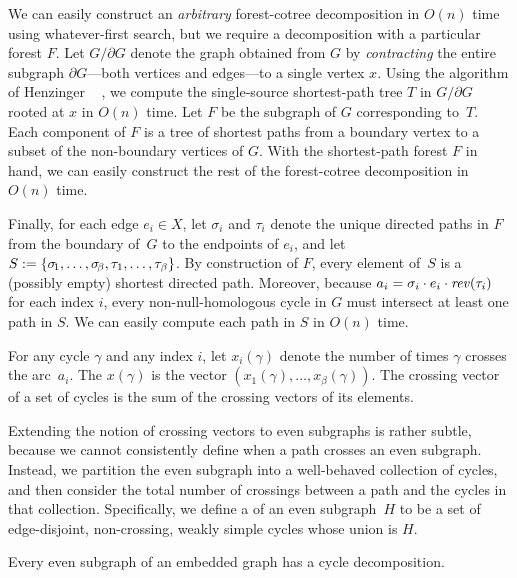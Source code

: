 We can easily construct an \emph{arbitrary} forest-cotree decomposition in $O(n)$ time using whatever-first search, but we require a decomposition with a particular forest $F$.  Let $G/\partial G$ denote the graph obtained from $G$ by \emph{contracting} the entire subgraph $\partial G$---both vertices and edges---to a single vertex $x$.  Using the algorithm of Henzinger \etal~\cite{hkrs-fspap-97}
, we compute the single-source shortest-path tree $T$ in $G/\partial G$ rooted at $x$ in $O(n)$ time.  Let $F$ be the subgraph of $G$ corresponding to~$T$.  Each component of $F$ is a tree of shortest paths from a boundary vertex to a subset of the non-boundary vertices of $G$.  With the shortest-path forest $F$ in hand, we can easily construct the rest of the forest-cotree decomposition in $O(n)$ time.

Finally, for each edge $e_i\in X$, let $\sigma_i$ and $\tau_i$ denote the unique directed paths in $F$ from the boundary of~$G$ to the endpoints of $e_i$, and let $S := \{ \sigma\!_1, \dots, \sigma\!_\beta, \allowbreak \tau_1, \dots, \tau_\beta \}$.  By construction of $F$, every element of~$S$ is a (possibly empty) shortest directed path.  Moreover, because $a_i = \sigma_i \cdot e_i \cdot \mathit{rev}(\tau_i)$ for each index $i$, every non-null-homologous cycle in $G$ must intersect at least one path in $S$.  We can easily compute each path in $S$ in $O(n)$ time.

For any cycle $\gamma$ and any index $i$, let $x_i(\gamma)$ denote the number of times $\gamma$ crosses the arc~$a_i$.  The  $x(\gamma)$ is the vector $(x_1(\gamma), \dots, x_\beta(\gamma))$.  The crossing vector of a set of cycles is the sum of the crossing vectors of its elements.

Extending the notion of crossing vectors to even subgraphs is rather subtle, because we cannot consistently define when a path crosses an even subgraph.  Instead, we partition the even subgraph into a well-behaved collection of cycles, and then consider the total number of crossings between a path and the cycles in that collection.  Specifically, we define a  of an even subgraph~$H$ to be a set of edge-disjoint, non-crossing, weakly simple cycles whose union is $H$.
\begin{lemma}
\label{lem:decomposition}
Every even subgraph of an embedded graph has a cycle decomposition.
\end{lemma}

